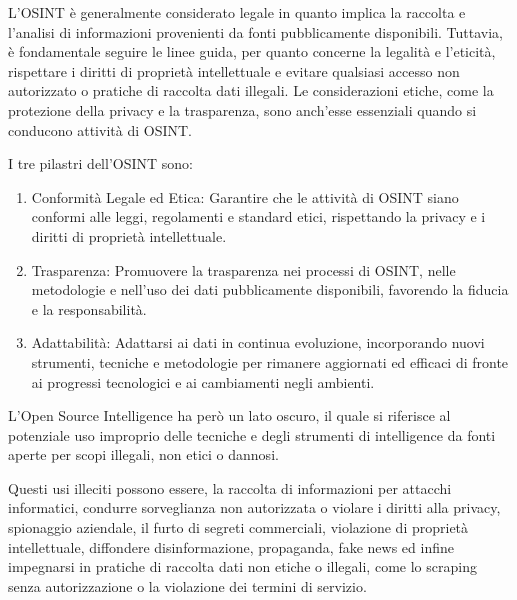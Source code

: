 L'OSINT è generalmente considerato legale in quanto implica la raccolta e l'analisi di informazioni provenienti da fonti pubblicamente disponibili. Tuttavia, è fondamentale seguire le linee guida, per quanto concerne la legalità e l'eticità, rispettare i diritti di proprietà intellettuale e evitare qualsiasi accesso non autorizzato o pratiche di raccolta dati illegali. 
Le considerazioni etiche, come la protezione della privacy e la trasparenza, sono anch'esse essenziali quando si conducono attività di OSINT.

I tre pilastri dell'OSINT sono:
\begin{enumerate}[I]
    \item Conformità Legale ed Etica: Garantire che le attività di OSINT siano conformi alle leggi, regolamenti e standard etici, rispettando la privacy e i diritti di proprietà intellettuale.
    \item Trasparenza: Promuovere la trasparenza nei processi di OSINT, nelle metodologie e nell'uso dei dati pubblicamente disponibili, favorendo la fiducia e la responsabilità.
    \item Adattabilità: Adattarsi ai dati in continua evoluzione, incorporando nuovi strumenti, tecniche e metodologie per rimanere aggiornati ed efficaci di fronte ai progressi tecnologici e ai cambiamenti negli ambienti.
\end{enumerate}


L'Open Source Intelligence ha però un lato oscuro, il quale si riferisce al potenziale uso improprio delle tecniche e degli strumenti di intelligence da fonti aperte per scopi illegali, non etici o dannosi.

Questi usi illeciti possono essere, la raccolta di informazioni per attacchi informatici, condurre sorveglianza non autorizzata o violare i diritti alla privacy, spionaggio aziendale, il furto di segreti commerciali, violazione di proprietà intellettuale, diffondere disinformazione, propaganda, fake news ed infine impegnarsi in pratiche di raccolta dati non etiche o illegali, come lo scraping senza autorizzazione o la violazione dei termini di servizio.

\let\cleardoublepage\clearpage